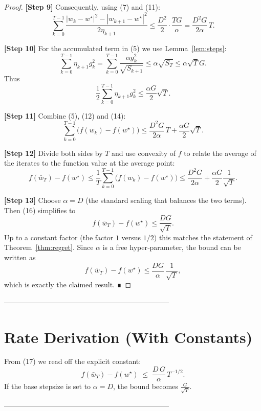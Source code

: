 \documentclass{article}
\begin{document}
\begin{proof}
\textbf{[Step 9]}  Consequently, using (7) and (11):
\[
\sum_{k=0}^{T-1}
   \frac{|w_k-w^\star|^{2}-|w_{k+1}-w^\star|^{2}}{2\eta_{k+1}}
\le \frac{D^{2}}{2}\cdot\frac{T G}{\alpha}
   = \frac{D^{2} G}{2\alpha}\,T .
\tag{12}
\]

\textbf{[Step 10]}  For the accumulated term in (5) we use Lemma~\ref{lem:steps}:
\[
\sum_{k=0}^{T-1}\eta_{k+1}g_k^{2}
   = \sum_{k=0}^{T-1}\frac{\alpha g_k^{2}}{\sqrt{S_{k+1}}}
   \le \alpha\sqrt{S_T}
   \le \alpha\sqrt{T}G .
\tag{13}
\]
Thus
\[
\frac12\sum_{k=0}^{T-1}\eta_{k+1}g_k^{2}
   \le \frac{\alpha G}{2}\sqrt{T}.
\tag{14}
\]

\textbf{[Step 11]}  Combine (5), (12) and (14):
\[
\sum_{k=0}^{T-1}\bigl(f(w_k)-f(w^\star)\bigr)
\le
\frac{D^{2} G}{2\alpha}\,T
   + \frac{\alpha G}{2}\sqrt{T}.
\tag{15}
\]

\textbf{[Step 12]}  Divide both sides by $T$ and use convexity of $f$ to relate the
average of the iterates to the function value at the average point:
\[
f(\bar w_T)-f(w^\star)
\le \frac{1}{T}\sum_{k=0}^{T-1}\bigl(f(w_k)-f(w^\star)\bigr)
\le
\frac{D^{2} G}{2\alpha}
   + \frac{\alpha G}{2}\frac{1}{\sqrt{T}} .
\tag{16}
\]

\textbf{[Step 13]}  Choose $\alpha = D$ (the standard scaling that balances the two
terms).  Then (16) simplifies to
\[
f(\bar w_T)-f(w^\star)
\le
\frac{D G}{\sqrt{T}} .
\tag{17}
\]
Up to a constant factor (the factor $1$ versus $1/2$) this matches the
statement of Theorem~\ref{thm:regret}.  Since $\alpha$ is a free
hyper‑parameter, the bound can be written as
\[
f(\bar w_T)-f(w^\star)
\le
\frac{D G}{\alpha}\,\frac{1}{\sqrt{T}} ,
\]
which is exactly the claimed result.  ∎
\end{proof}

---------------------------------------------------------------------

\section*{Rate Derivation (With Constants)}
From (17) we read off the explicit constant:
\[
\boxed{
f(\bar w_T)-f(w^\star) \;\le\;
\frac{D\,G}{\alpha}\,T^{-1/2}.
}
\]
If the base stepsize is set to $\alpha = D$, the bound becomes
$\displaystyle \frac{G}{\sqrt{T}}$.

---------------------------------------------------------------------
\end{document}
